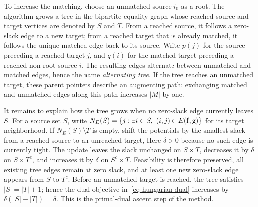 To increase the matching, choose an unmatched source $i_0$ as a root. The algorithm grows a tree in the bipartite equality graph whose reached source and target vertices are denoted by $S$ and $T$. From a reached source, it follows a zero-slack edge to a new target; from a reached target that is already matched, it follows the unique matched edge back to its source. Write $p(j)$ for the source preceding a reached target $j$, and $q(i)$ for the matched target preceding a reached non-root source $i$. The resulting edges alternate between unmatched and matched edges, hence the name \emph{alternating tree}. If the tree reaches an unmatched target, these parent pointers describe an augmenting path: exchanging matched and unmatched edges along this path increases $|M|$ by one.

It remains to explain how the tree grows when no zero-slack edge currently leaves $S$. For a source set $S$, write $N_E(S)=\{j:\exists i\in S,\ (i,j)\in E(\mathrm{f},\mathrm{g})\}$ for its target neighborhood. If $N_E(S)\setminus T$ is empty, shift the potentials by the smallest slack from a reached source to an unreached target,
Here $\delta>0$ because no such edge is currently tight. The update leaves the slack unchanged on $S\times T$, decreases it by $\delta$ on $S\times T^c$, and increases it by $\delta$ on $S^c\times T$. Feasibility is therefore preserved, all existing tree edges remain at zero slack, and at least one new zero-slack edge appears from $S$ to $T^c$. Before an unmatched target is reached, the tree satisfies $|S|=|T|+1$; hence the dual objective in~\eqref{eq-hungarian-dual} increases by $\delta(|S|-|T|)=\delta$. This is the primal-dual ascent step of the method.

